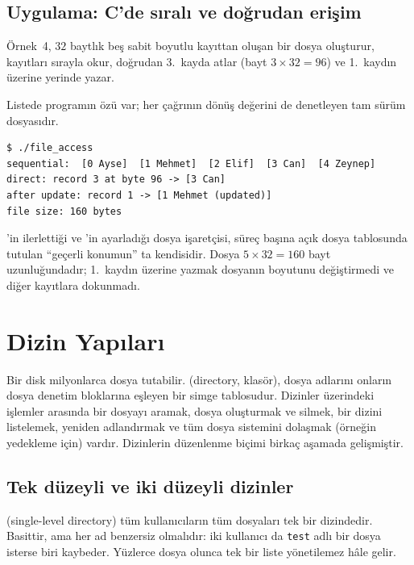 \subsection{Uygulama: C'de sıralı ve doğrudan erişim}

Örnek~4, $32$ baytlık beş sabit boyutlu kayıttan oluşan bir dosya oluşturur, kayıtları sırayla okur, doğrudan 3.\ kayda atlar (bayt $3 \times 32 = 96$) ve 1.\ kaydın üzerine yerinde yazar.

Listede programın özü var; her çağrının dönüş değerini de denetleyen tam sürüm  dosyasıdır.



\begin{lstlisting}[style=term]
$ ./file_access
sequential:  [0 Ayse]  [1 Mehmet]  [2 Elif]  [3 Can]  [4 Zeynep]
direct: record 3 at byte 96 -> [3 Can]
after update: record 1 -> [1 Mehmet (updated)]
file size: 160 bytes
\end{lstlisting}

'in ilerlettiği ve 'in ayarladığı dosya işaretçisi, süreç başına açık dosya tablosunda tutulan ``geçerli konumun'' ta kendisidir. Dosya $5 \times 32 = 160$ bayt uzunluğundadır; 1.\ kaydın üzerine yazmak dosyanın boyutunu değiştirmedi ve diğer kayıtlara dokunmadı.

\section{Dizin Yapıları}

Bir disk milyonlarca dosya tutabilir.  (directory, klasör), dosya adlarını onların dosya denetim bloklarına eşleyen bir simge tablosudur. Dizinler üzerindeki işlemler arasında bir dosyayı aramak, dosya oluşturmak ve silmek, bir dizini listelemek, yeniden adlandırmak ve tüm dosya sistemini dolaşmak (örneğin yedekleme için) vardır. Dizinlerin düzenlenme biçimi birkaç aşamada gelişmiştir.

\subsection{Tek düzeyli ve iki düzeyli dizinler}

 (single-level directory) tüm kullanıcıların tüm dosyaları tek bir dizindedir. Basittir, ama her ad benzersiz olmalıdır: iki kullanıcı da \texttt{test} adlı bir dosya isterse biri kaybeder. Yüzlerce dosya olunca tek bir liste yönetilemez hâle gelir.

